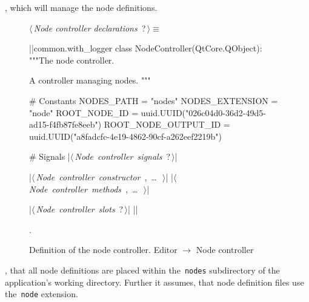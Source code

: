 \documentclass[%
    a4paper,    %
    justified,  %
    nobib,      %
    openany     %
]{tufte-book}
\begin{document}
, which will manage the
node definitions.

\begin{figure}
\begin{flushleft} \small
\begin{minipage}{\linewidth}\label{scrap106}\raggedright\small
{} $\langle\,${\itshape Node controller declarations}\nobreak\ {\footnotesize {?}}$\,\rangle\equiv$
\vspace{-1ex}
\begin{pythoncode}
|\normalfont{}\fontfamily{}|common.with_logger
class NodeController(QtCore.QObject):
    """The node controller.

    A controller managing nodes.
    """

    # Constants
    NODES_PATH = "nodes"
    NODES_EXTENSION = "node"
    ROOT_NODE_ID = uuid.UUID("026c04d0-36d2-49d5-ad15-f4fb87fe8eeb")
    ROOT_NODE_OUTPUT_ID = uuid.UUID("a8fadcfc-4e19-4862-90cf-a262eef2219b")

    # Signals
    |\hbox{$\langle\,${\itshape Node controller signals}\nobreak\ {\footnotesize ?}$\,\rangle$}|

    |\hbox{$\langle\,${\itshape Node controller constructor}\nobreak\ {\footnotesize {}, \ldots\ }$\,\rangle$}|
    |\hbox{$\langle\,${\itshape Node controller methods}\nobreak\ {\footnotesize {}, \ldots\ }$\,\rangle$}|

    |\hbox{$\langle\,${\itshape Node controller slots}\nobreak\ {\footnotesize ?}$\,\rangle$}|
|\NWsep|
\end{pythoncode}
\vspace{1.5ex}
\footnotesize
\begin{list}{}{\setlength{\itemsep}{-\parsep}\setlength{\itemindent}{-\leftmargin}}
\item {\NWtxtMacroNoRef}.

\item{}
\end{list}
\end{minipage}\vspace{4ex}
\end{flushleft}
\caption{Definition of the node controller.
  \newline{}\newline{}Editor $\rightarrow$ Node controller}
\label{editor:lst:node-controller}
\end{figure}

, that all node definitions are placed
within the~\verb=nodes= subdirectory of the application's working directory.
Further it assumes, that node definition files use the~\verb=node= extension.
\end{document}
